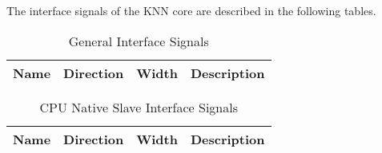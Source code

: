 \label{sec:is}

The interface signals of the KNN core are described in the following tables.

\begin{table}[H]
  \centering
  \begin{tabular}{|l|l|r|p{10.5cm}|}
    
    \hline
    \rowcolor{iob-green}
    {\bf Name} & {\bf Direction} & {\bf Width} & {\bf Description}  \\ \hline \hline

    
 
  \end{tabular}
  \caption{General Interface Signals}
  \label{gen_is_tab:is}
\end{table}

\begin{table}[H]
  \centering
  \begin{tabular}{|l|l|r|p{10.5cm}|}
    
    \hline
    \rowcolor{iob-green}
    {\bf Name} & {\bf Direction} & {\bf Width} & {\bf Description}  \\ \hline \hline

    
 
  \end{tabular}
  \caption{CPU Native Slave Interface Signals}
  \label{cpu_nat_s_is_tab:is}
\end{table}
\clearpage

%    
%
%    
% 

